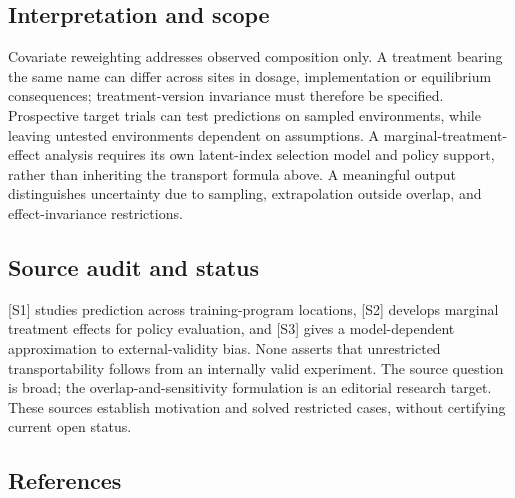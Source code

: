 \documentclass[11pt,a4paper]{article}
\begin{document}
\subsection*{Interpretation and scope}

Covariate reweighting addresses observed composition only. A treatment bearing the same name can differ across sites in dosage, implementation or equilibrium consequences; treatment-version invariance must therefore be specified. Prospective target trials can test predictions on sampled environments, while leaving untested environments dependent on assumptions. A marginal-treatment-effect analysis requires its own latent-index selection model and policy support, rather than inheriting the transport formula above. A meaningful output distinguishes uncertainty due to sampling, extrapolation outside overlap, and effect-invariance restrictions.

\subsection*{Source audit and status}

[S1] studies prediction across training-program locations, [S2] develops marginal treatment effects for policy evaluation, and [S3] gives a model-dependent approximation to external-validity bias. None asserts that unrestricted transportability follows from an internally valid experiment. The source question is broad; the overlap-and-sensitivity formulation is an editorial research target. These sources establish motivation and solved restricted cases, without certifying current open status.

\subsection*{References}
\end{document}
